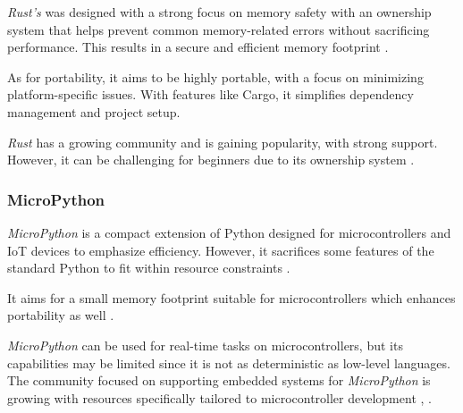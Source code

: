 \textit{Rust's} was designed with a strong focus on memory safety with an ownership system that helps prevent common memory-related errors without sacrificing performance.
This results in a secure and efficient memory footprint \cite{LPROG2}.

As for portability, it aims to be highly portable, with a focus on minimizing platform-specific issues.
With features like Cargo, it simplifies dependency management and project setup.

\textit{Rust} has a growing community and is gaining popularity, with strong support.
However, it can be challenging for beginners due to its ownership system \cite{LPROG7}.

\subsubsection{MicroPython}
\textit{MicroPython} is a compact extension of Python designed for microcontrollers and IoT devices to emphasize efficiency.
However, it sacrifices some features of the standard Python to fit within resource constraints \cite{LPROG2}.

It aims for a small memory footprint suitable for microcontrollers which enhances portability as well \cite{LPROG7}.

\textit{MicroPython} can be used for real-time tasks on microcontrollers, but its capabilities may be limited since it is not as deterministic as low-level languages.
The community focused on supporting embedded systems for \textit{MicroPython} is growing with resources specifically tailored to microcontroller development \cite{LPROG2}, \cite{LPROG5}.

